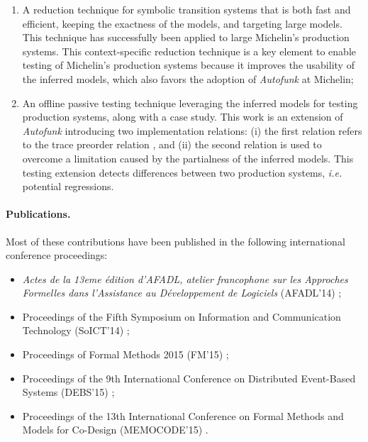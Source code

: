 \begin{enumerate}
    \item A reduction technique for symbolic transition systems
        that is both fast and efficient, keeping the exactness of
        the models, and targeting large models. This technique
        has successfully been applied to large Michelin's
        production systems. This context-specific reduction
        technique is a key element to enable testing of
        Michelin's production systems because it improves the
        usability of the inferred models, which also favors the
        adoption of \emph{Autofunk} at Michelin;

    \item An offline passive testing technique leveraging the
        inferred models for testing production systems, along
        with a case study. This work is an extension of
        \textit{Autofunk} introducing two implementation
        relations: (i) the first relation refers to the trace
        preorder relation \cite{DNH84}, and (ii) the second
        relation is used to overcome a limitation caused by the
        partialness of the inferred models. This testing
        extension detects differences between two production
        systems, \emph{i.e.} potential regressions.
\end{enumerate}

\paragraph{Publications.} Most of these contributions have been
published in the following international conference proceedings:

\begin{itemize}
    \item \emph{Actes de la 13eme {\'e}dition d'AFADL, atelier
        francophone sur les Approches Formelles dans l'Assistance au
        D{\'e}veloppement de Logiciels} (AFADL'14)
        \cite{durand2014inference};

    \item Proceedings of the Fifth Symposium on Information and
        Communication Technology (SoICT'14)
        \cite{DBLP:conf/soict/DurandS14};

    \item Proceedings of Formal Methods 2015 (FM'15)
        \cite{DBLP:conf/fm/DurandS15};

    \item Proceedings of the 9th International Conference on
        Distributed Event-Based Systems (DEBS'15)
        \cite{DBLP:conf/debs/SalvaD15};

    \item Proceedings of the 13th International Conference on Formal
        Methods and Models for Co-Design (MEMOCODE'15)
        \cite{7340480}.
\end{itemize}

